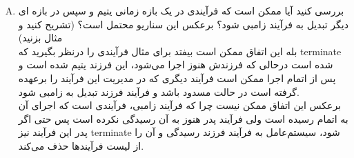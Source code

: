 \documentclass[]{article}
\begin{document}
\begin{enumerate}[(A)]
\begin{enumerate}
        \end{enumerate}
    \item ﺑﺮﺭﺳﯽ ﮐﻨﯿﺪ ﺁﯾﺎ ﻣﻤﮑﻦ ﺍﺳﺖ ﮐﻪ ﻓﺮﺁﯾﻨﺪﯼ ﺩﺭ ﯾﮏ ﺑﺎﺯﻩ ﺯﻣﺎﻧﯽ ﯾﺘﯿﻢ ﻭ ﺳﭙﺲ ﺩﺭ ﺑﺎﺯﻩ ﺍﯼ ﺩﯾﮕﺮ ﺗﺒﺪﯾﻞ ﺑﻪ ﻓﺮﺁﯾﻨﺪ ﺯﺍﻣﺒﯽ ﺷﻮﺩ؟
    ﺑﺮﻋﮑﺲ ﺍﯾﻦ ﺳﻨﺎﺭﯾﻮ ﻣﺤﺘﻤﻞ ﺍﺳﺖ؟
    (ﺗﺸﺮﯾﺢ ﮐﻨﯿﺪ ﻭ ﻣﺜﺎﻝ ﺑﺰﻧﯿﺪ)
    \\
    بله این اتفاق ممکن است بیفتد برای مثال فرآیندی را درنظر بگیرید که 
    terminate شده است
    درحالی که فرزندش هنوز اجرا می‌شود،
    این فرزند یتیم شده است و پس از اتمام اجرا ممکن است فرآیند دیگری که در مدیریت این فرآیند را برعهده گرفته است
    در حالت مسدود باشد و فرآیند فرزند تبدیل به زامبی شود.
    \\
    برعکس این اتفاق ممکن نیست چرا که فرآیند زامبی، فرآیندی است که اجرای آن به اتمام رسیده است
    ولی فرآیند پدر هنوز به آن رسیدگی نکرده است پس حتی اگر پدر این فرآیند نیز
    terminate شود،
    سیستم‌عامل به فرآیند فرزند رسیدگی و آن را از لیست فرآیندها حذف می‌کند.
\end{enumerate}
\end{document}
